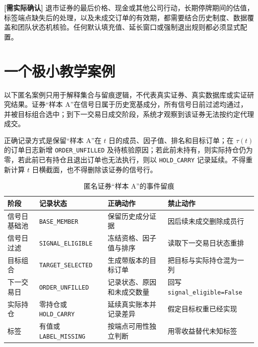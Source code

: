 \begin{confirmbox}
\textbf{[需实际确认]} 退市证券的最后价格、现金或其他公司行动，长期停牌期间的估值，标签端点缺失后的处理，以及未成交订单的有效期，都需要结合历史制度、数据覆盖和团队状态机核验。任何默认填充值、延长窗口或强制退出规则都必须显式配置。
\end{confirmbox}

\section{一个极小教学案例}

以下匿名案例只用于解释集合与留痕逻辑，不代表真实证券、真实数据库或实证研究结果。证券“样本 A”在信号日属于历史宽基成分，所有信号日前过滤均通过，并被目标组合选中；到下一交易日成交阶段，系统才观察到该证券无法按约定代理成交。

\begin{casebox}
正确记录方式是保留“样本 A”在 \(t\) 日的成员、因子值、排名和目标订单；在 \(\tau(t)\) 的订单日志新增 \texttt{ORDER\_UNFILLED} 及待核验原因；若此前未持有，则实际持仓仍为零，若此前已有持仓且退出订单也无法执行，则以 \texttt{HOLD\_CARRY} 记录延续。不得重新计算 \(t\) 日横截面，也不得删除该证券的信号行。
\end{casebox}

\begin{table}[htbp]
  \centering
  \small
  \caption{匿名证券“样本 A”的事件留痕}
  \label{tab:ch03-anonymous-case}
  \begin{tabularx}{\textwidth}{p{2.6cm} p{2.9cm} Y Y}
    \toprule
    阶段 & 记录状态 & 正确动作 & 禁止动作 \\
    \midrule
    信号日基础池 & \texttt{BASE\_MEMBER} & 保留历史成分证据 & 因后续未成交删除成员行 \\
    信号日过滤 & \texttt{SIGNAL\_ELIGIBLE} & 冻结资格、因子值与排序 & 读取下一交易日状态重排 \\
    目标组合 & \texttt{TARGET\_SELECTED} & 生成带版本的目标订单 & 把目标与实际持仓混为一列 \\
    下一交易日 & \texttt{ORDER\_UNFILLED} & 记录状态、原因和未成交数量 & 回写 \texttt{signal\_eligible=False} \\
    实际持仓 & 零持仓或 \texttt{HOLD\_CARRY} & 延续真实账本并记录差异 & 假定目标权重已经实现 \\
    标签 & 有值或 \texttt{LABEL\_MISSING} & 按端点可用性独立判断 & 用零收益替代未知标签 \\
    \bottomrule
  \end{tabularx}
\end{table}

